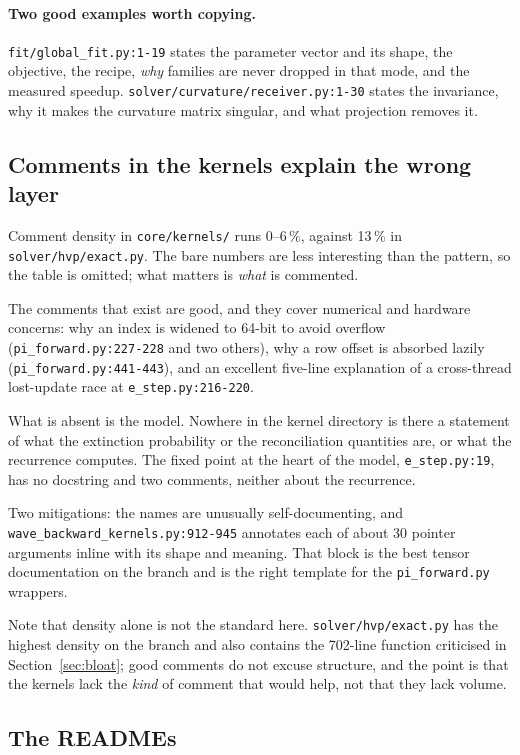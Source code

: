 \documentclass[11pt]{article}
\newcommand{\loc}[1]{\nolinkurl{#1}}
\newcommand{\dir}[1]{\nolinkurl{#1}}
\begin{document}
\paragraph{Two good examples worth copying.}  \loc{fit/global\_fit.py:1-19}
states the parameter vector and its shape, the objective, the recipe, \emph{why}
families are never dropped in that mode, and the measured speedup.
\loc{solver/curvature/receiver.py:1-30} states the invariance, why it makes the
curvature matrix singular, and what projection removes it.

\subsection{Comments in the kernels explain the wrong layer}

Comment density in \dir{core/kernels/} runs 0--6\,\%, against 13\,\% in
\dir{solver/hvp/exact.py}.  The bare numbers are less interesting than the
pattern, so the table is omitted; what matters is \emph{what} is commented.

The comments that exist are good, and they cover numerical and hardware
concerns: why an index is widened to 64-bit to avoid overflow
(\loc{pi\_forward.py:227-228} and two others), why a row offset is absorbed
lazily (\loc{pi\_forward.py:441-443}), and an excellent five-line explanation of
a cross-thread lost-update race at \loc{e\_step.py:216-220}.

What is absent is the model.  Nowhere in the kernel directory is there a
statement of what the extinction probability or the reconciliation quantities
are, or what the recurrence computes.  The fixed point at the heart of the
model, \loc{e\_step.py:19}, has no docstring and two comments, neither about the
recurrence.

Two mitigations: the names are unusually self-documenting, and
\loc{wave\_backward\_kernels.py:912-945} annotates each of about 30 pointer
arguments inline with its shape and meaning.  That block is the best tensor
documentation on the branch and is the right template for the
\dir{pi\_forward.py} wrappers.

Note that density alone is not the standard here.  \dir{solver/hvp/exact.py} has
the highest density on the branch and also contains the 702-line function
criticised in Section~\ref{sec:bloat}; good comments do not excuse structure,
and the point is that the kernels lack the \emph{kind} of comment that would
help, not that they lack volume.

\subsection{The READMEs}
\end{document}
